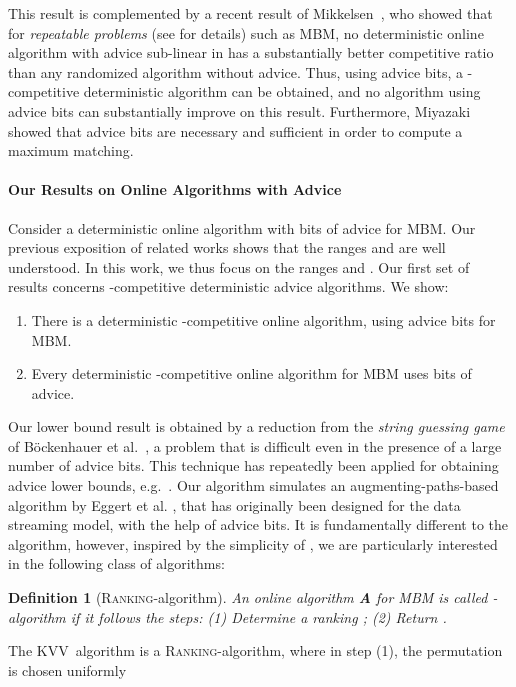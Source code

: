 \documentclass[a4paper]{article}
\newcommand{\Rank}{\textsc{Ranking}}
\newcommand{\KVV}{\textsc{KVV}}
\newtheorem{definition}{Definition}
\begin{document}
This result is complemented by a recent result of Mikkelsen~\cite{m15}, who showed that
for {\em repeatable problems} (see \cite{m15} for details) such as \textsc{MBM},
no deterministic online algorithm with advice sub-linear in 
has a substantially better competitive ratio than any randomized algorithm without advice.
Thus, using
 advice bits, a -competitive deterministic algorithm can be obtained,
and no algorithm using  advice bits can substantially improve on this result. Furthermore,
Miyazaki~\cite{m14} showed that  advice bits are necessary
and sufficient in order to compute a maximum matching.

\paragraph*{Our Results on Online Algorithms with Advice}
Consider a deterministic online algorithm with  bits of advice for \textsc{MBM}. Our previous exposition
of related works shows that the ranges  and 
are well understood. In this work, we thus focus on the ranges
 and . Our first set of results concerns
-competitive deterministic advice algorithms. We show:
\begin{enumerate}
 \item There is a deterministic -competitive online algorithm, using
  advice bits for \textsc{MBM}.

 \item Every deterministic -competitive online algorithm for \textsc{MBM} uses
  bits of advice.
\end{enumerate}
Our lower bound result is obtained by a reduction from the {\em string guessing game} of B\"{o}ckenhauer et
al.~\cite{bhkkss14}, a problem that is difficult even in the presence of a large number of advice bits.
This technique has repeatedly been applied for obtaining advice lower bounds, e.g.\ \cite{arrs13,GuptaKL13,BoyarKLL14,adkrr15,BoyarKLL16,BianchiBBKP16}.
Our algorithm simulates an augmenting-paths-based algorithm by Eggert et al. \cite{ekms11}, that has originally
been designed for the data streaming model, with the help of advice bits.
It is fundamentally
different to the  algorithm, however, inspired by the simplicity of , we are particularly interested in
the following class of algorithms:
\begin{definition}[\textsc{Ranking}-algorithm]
 An online algorithm \textbf{A} for \textsc{MBM} is called -algorithm if it follows the
 steps: (1) Determine a ranking ; (2) Return .
\end{definition}
The \KVV~algorithm is a \Rank-algorithm, where in step (1), the permutation  is chosen uniformly
\end{document}
